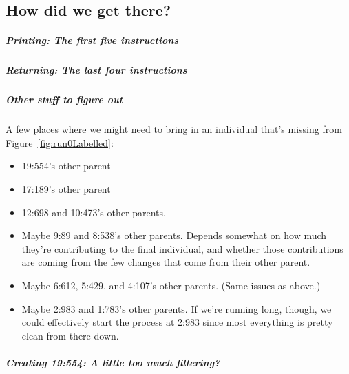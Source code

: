 \subsection{How did we get there?}

\subparagraph{Printing: The first five instructions}

\subparagraph{Returning: The last four instructions}

\subparagraph{Other stuff to figure out}

A few places where we might need to bring in an individual that's 
missing from Figure~\ref{fig:run0Labelled}:
\begin{itemize}
	\item 19:554's other parent
	\item 17:189's other parent
	\item 12:698 and 10:473's other parents.
	\item Maybe 9:89 and 8:538's other parents. Depends somewhat on how much
	they're contributing to the final individual, and whether those 
	contributions are coming from the few changes that come from their other
	parent.
	\item Maybe 6:612, 5:429, and 4:107's other parents. (Same issues as above.)
	\item Maybe 2:983 and 1:783's other parents. If we're running long, though, 
	we could effectively start the process at 2:983 since most everything is
	pretty clean from there down.
\end{itemize}


\subparagraph{Creating 19:554: A little too much filtering?}

